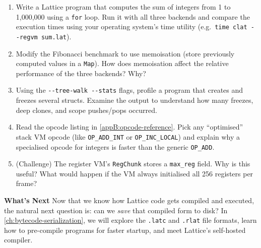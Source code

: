\begin{enumerate}
  \item Write a Lattice program that computes the sum of integers from 1 to
        1{,}000{,}000 using a \lstinline|for| loop. Run it with all three
        backends and compare the execution times using your operating system's
        time utility (e.g.\ \lstinline|time clat --regvm sum.lat|).

  \item Modify the Fibonacci benchmark to use memoisation (store previously
        computed values in a \lstinline|Map|). How does memoisation affect the
        relative performance of the three backends? Why?

  \item Using the \lstinline|--tree-walk --stats| flags, profile a program
        that creates and freezes several structs. Examine the output to
        understand how many freezes, deep clones, and scope pushes/pops
        occurred.

  \item Read the opcode listing in \cref{appB:opcode-reference}. Pick any
        ``optimised'' stack VM opcode (like \lstinline|OP_ADD_INT| or
        \lstinline|OP_INC_LOCAL|) and explain why a specialised opcode for
        integers is faster than the generic \lstinline|OP_ADD|.

  \item (Challenge) The register VM's \lstinline|RegChunk| stores a
        \lstinline|max_reg| field. Why is this useful? What would happen if the
        VM always initialised all 256 registers per frame?
\end{enumerate}

\vspace{1em}
\noindent\textbf{What's Next}\quad
Now that we know how Lattice code gets compiled and executed, the natural
next question is: can we \emph{save} that compiled form to disk? In
\cref{ch:bytecode-serialization}, we will explore the \lstinline|.latc| and
\lstinline|.rlat| file formats, learn how to pre-compile programs for faster
startup, and meet Lattice's self-hosted compiler.
